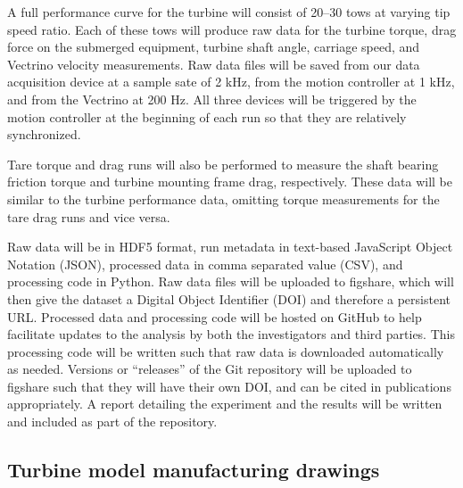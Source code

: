 \documentclass[12pt]{scrreprt}
\begin{document}
A full performance curve for the turbine will consist of 20--30 tows at varying
tip speed ratio. Each of these tows will produce raw data for the turbine
torque, drag force on the submerged equipment, turbine shaft angle, carriage
speed, and Vectrino velocity measurements. Raw data files will be saved from our
data acquisition device at a sample sate of 2 kHz, from the motion controller at
1 kHz, and from the Vectrino at 200 Hz. All three devices will be triggered by
the motion controller at the beginning of each run so that they are relatively
synchronized.

Tare torque and drag runs will also be performed to measure the shaft bearing
friction torque and turbine mounting frame drag, respectively. These data will
be similar to the turbine performance data, omitting torque measurements for the
tare drag runs and vice versa.

Raw data will be in HDF5 format, run metadata in text-based JavaScript Object
Notation (JSON), processed data in comma separated value (CSV), and processing
code in Python. Raw data files will be uploaded to figshare, which will then
give the dataset a Digital Object Identifier (DOI) and therefore a persistent
URL. Processed data and processing code will be hosted on GitHub to help
facilitate updates to the analysis by both the investigators and third parties.
This processing code will be written such that raw data is downloaded
automatically as needed. Versions  or ``releases'' of the Git repository will be
uploaded to figshare such that they will have their own DOI, and can be cited in
publications appropriately. A report detailing the experiment and the results
will be written and included as part of the repository.

\renewcommand{\bibname}{References}



\begin{appendices}

\chapter{Turbine model manufacturing drawings}

\label{app-turbine_dwgs}



\end{appendices}
\end{document}
